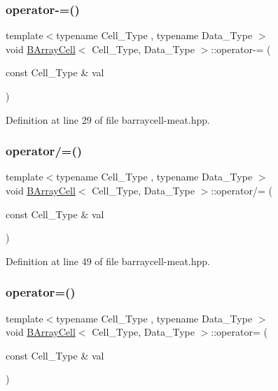 \subsubsection{\texorpdfstring{operator-\/=()}{operator-=()}}
{\footnotesize\ttfamily template$<$typename Cell\+\_\+\+Type , typename Data\+\_\+\+Type $>$ \\
void \hyperlink{class_b_array_cell}{B\+Array\+Cell}$<$ Cell\+\_\+\+Type, Data\+\_\+\+Type $>$\+::operator-\/= (\begin{DoxyParamCaption}\item[{const Cell\+\_\+\+Type \&}]{val }\end{DoxyParamCaption})\hspace{0.3cm}{\ttfamily [inline]}}



Definition at line 29 of file barraycell-\/meat.\+hpp.

\mbox{\label{class_b_array_cell_aa5debb920d8ffc246e7d463ac8e26152}} 
\subsubsection{\texorpdfstring{operator/=()}{operator/=()}}
{\footnotesize\ttfamily template$<$typename Cell\+\_\+\+Type , typename Data\+\_\+\+Type $>$ \\
void \hyperlink{class_b_array_cell}{B\+Array\+Cell}$<$ Cell\+\_\+\+Type, Data\+\_\+\+Type $>$\+::operator/= (\begin{DoxyParamCaption}\item[{const Cell\+\_\+\+Type \&}]{val }\end{DoxyParamCaption})\hspace{0.3cm}{\ttfamily [inline]}}



Definition at line 49 of file barraycell-\/meat.\+hpp.

\mbox{\label{class_b_array_cell_ad20091ef5961aed4241bd8d0b6d5dd0d}} 
\subsubsection{\texorpdfstring{operator=()}{operator=()}}
{\footnotesize\ttfamily template$<$typename Cell\+\_\+\+Type , typename Data\+\_\+\+Type $>$ \\
void \hyperlink{class_b_array_cell}{B\+Array\+Cell}$<$ Cell\+\_\+\+Type, Data\+\_\+\+Type $>$\+::operator= (\begin{DoxyParamCaption}\item[{const Cell\+\_\+\+Type \&}]{val }\end{DoxyParamCaption})\hspace{0.3cm}{\ttfamily [inline]}}



